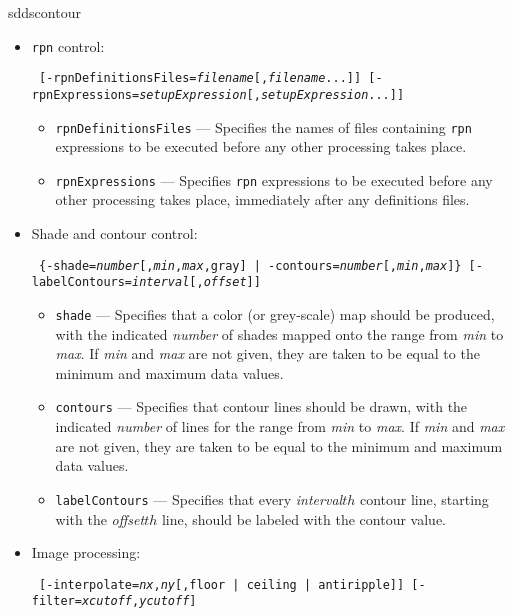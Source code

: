\begin{sddsprog}{sddscontour}
\begin{itemize}
    \item \verb|rpn| control:
\begin{flushleft}{\tt
[-rpnDefinitionsFiles={\em filename}[,{\em filename}...]]
[-rpnExpressions={\em setupExpression}[,{\em setupExpression}...]]
}\end{flushleft}
        \begin{itemize}
        \item \verb|rpnDefinitionsFiles| --- Specifies the names of files containing \verb|rpn| expressions
        to be executed before any other processing takes place.
        \item \verb|rpnExpressions| --- Specifies \verb|rpn| expressions to be executed before any other processing
         takes place, immediately after any definitions files.
        \end{itemize}
    \item Shade and contour control:
\begin{flushleft}{\tt
\{-shade={\em number}[,{\em min},{\em max},gray] | -contours={\em number}[,{\em min},{\em max}]\}
[-labelContours={\em interval}[,{\em offset}]]
}\end{flushleft}
        \begin{itemize}
        \item \verb|shade| --- Specifies that a color (or grey-scale) map should be produced, with the
        indicated {\em number} of shades mapped onto the range from {\em min} to {\em max}.  If {\em min}
        and {\em max} are not given, they are taken to be equal to the minimum and maximum data values.
        \item \verb|contours| --- Specifies that contour lines should be drawn, with the 
        indicated {\em number} of lines for  the range from {\em min} to {\em max}.  If {\em min}
        and {\em max} are not given, they are taken to be equal to the minimum and maximum data values.
        \item \verb|labelContours| --- Specifies that every {\em interval}$ {th}$ contour line, starting with
        the {\em offset}$ {th}$ line, should be labeled with the contour value.
        \end{itemize}
    \item Image processing:
\begin{flushleft}{\tt
[-interpolate={\em nx},{\em ny}[,{floor | ceiling | antiripple}]] [-filter={\em xcutoff},{\em ycutoff}]
}\end{flushleft}
        \begin{itemize}     

\end{itemize}
\end{itemize}
\end{sddsprog}
